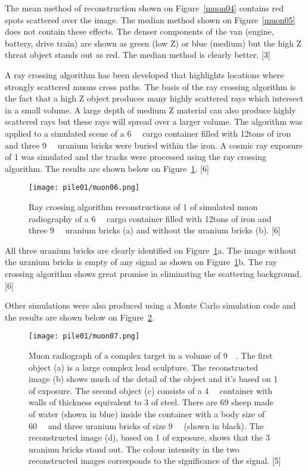 \documentclass[a4paper]{article}
\begin{document}
The mean method of reconstruction shown on Figure~\ref{muon04} contains red spots scattered over the image.
The median method shown on Figure~\ref{muon05} does not contain these effects. The denser components of
the van (engine, battery, drive train) are shown as green (low Z) or blue (medium) but the high Z
threat object stands out as red. The median method is clearly better. [3]

A ray crossing algorithm has been developed that highlights locations where strongly scattered
muons cross paths. The basis of the ray crossing algorithm is the fact that a high Z object produces
many highly scattered rays which intersect in a small volume. A large depth of medium Z material
can also produce highly scattered rays but these rays will spread over a larger volume. The algorithm
was applied to a simulated scene of a \unit{6}{\cubic\metre} cargo container filled with \unit{12}{tons} of iron and
three \unit{9}{\cubic{\centi\metre}} uranium bricks were buried within the iron. A cosmic ray exposure of \unit{1}{\minute} was
simulated and the tracks were processed using the ray crossing algorithm. The results are shown
below on Figure~\ref{muon06}. [6]

\begin{figure}[h!]
  \texttt{[image: pile01/muon06.png]}
  \caption{Ray crossing algorithm reconstructions of \unit{1}{\minute} of simulated muon radiography of a
\unit{6}{\cubic\metre} cargo container filled with \unit{12}{tons} of iron and
three \unit{9}{\cubic{\centi\metre}} uranium bricks (a) and without the uranium bricks (b). [6]}
  \label{muon06}
\end{figure}

All three uranium bricks are clearly identified on Figure~\ref{muon06}a. The image without the uranium bricks is
empty of any signal as shown on Figure~\ref{muon06}b. The ray crossing algorithm shows great promise in
eliminating the scattering background. [6]

Other simulations were also produced using a Monte Carlo simulation code and the results are
shown below on Figure~\ref{muon07}.

\begin{figure}[h!]
  \texttt{[image: pile01/muon07.png]}
  \caption{Muon radiograph of a complex target in a volume of \unit{9}{\cubic\metre}. The first object (a) is a
large complex lead sculpture. The reconstructed image (b) shows much of the detail of the object
and it’s based on \unit{1}{\minute} of exposure. The second object (c) consists of a \unit{4}{\cubic\metre} container with
walls of thickness equivalent to \unit{3}{\milli\metre} of steel. There are 69 sheep made of water (shown in blue)
inside the container with a body size of \unit{60}{\cubic{\centi\metre}} and three uranium bricks of 
size \unit{9}{\cubic{\centi\metre}} (shown in black). The reconstructed image (d), based 
on \unit{1}{\minute} of exposure, shows that the 3 uranium bricks stand out. The colour intensity in the two reconstructed 
images corresponds to the significance of the signal. [5]}
  \label{muon07}
\end{figure}
\end{document}
